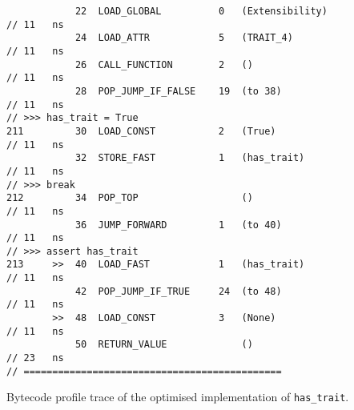\begin{code}
\begin{verbatim}
            22  LOAD_GLOBAL          0   (Extensibility)                                    // 11   ns
            24  LOAD_ATTR            5   (TRAIT_4)                                          // 11   ns
            26  CALL_FUNCTION        2   ()                                                 // 11   ns
            28  POP_JUMP_IF_FALSE    19  (to 38)                                            // 11   ns
// >>> has_trait = True
211         30  LOAD_CONST           2   (True)                                             // 11   ns
            32  STORE_FAST           1   (has_trait)                                        // 11   ns
// >>> break
212         34  POP_TOP                  ()                                                 // 11   ns
            36  JUMP_FORWARD         1   (to 40)                                            // 11   ns
// >>> assert has_trait
213     >>  40  LOAD_FAST            1   (has_trait)                                        // 11   ns
            42  POP_JUMP_IF_TRUE     24  (to 48)                                            // 11   ns
        >>  48  LOAD_CONST           3   (None)                                             // 11   ns
            50  RETURN_VALUE             ()                                                 // 23   ns
// =============================================
    \end{verbatim}
    \caption{Bytecode profile trace of the optimised implementation of \texttt{has_trait}.}
    \label{listing:bytecode-profiles-hastrait-optimised}
\end{code}





